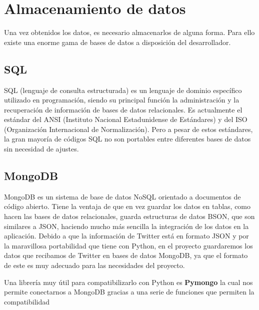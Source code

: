 \section{Almacenamiento de datos}
Una vez obtenidos los datos, es necesario almacenarlos de alguna forma. Para ello existe una enorme gama de bases de datos a disposición del desarrollador. 

\subsection{SQL}

SQL (lenguaje de consulta estructurada) es un lenguaje de dominio específico utilizado en programación, siendo su principal función la administración y la recuperación de información de bases de datos relacionales. Es actualmente el estándar del ANSI (Instituto Nacional Estadunidense de Estándares) y del ISO (Organización Internacional de Normalización). Pero a pesar de estos estándares, la gran mayoría de códigos SQL no son portables entre diferentes bases de datos sin necesidad de ajustes. 

\subsection{MongoDB}

MongoDB es un sistema de base de datos NoSQL orientado a documentos de código abierto. Tiene la ventaja de que en vez guardar los datos en tablas, como hacen las bases de datos relacionales, guarda estructuras de datos BSON, que son similares a JSON, haciendo mucho más sencilla la integración de los datos en la aplicación. Debido a que la información de Twitter está en formato JSON y por la maravillosa portabilidad que tiene con Python, en el proyecto guardaremos los datos que recibamos de Twitter en bases de datos MongoDB, ya que el formato de este es muy adecuado para las necesidades del proyecto. 

Una librería muy útil para compatibilizarlo con Python es \textbf{Pymongo} la cual nos permite conectarnos a MongoDB gracias a una serie de funciones que permiten la compatibilidad
  



 
